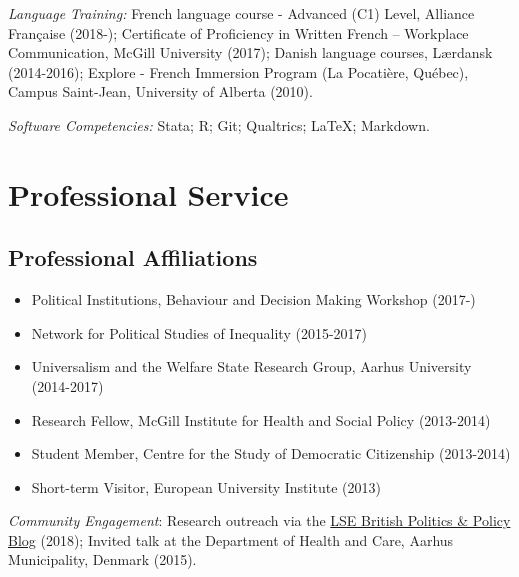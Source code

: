 \documentclass[letterpaper,fontsize=10pt]{scrartcl}
\begin{document}
{} \textit{Language Training:} French language course - Advanced (C1) Level, Alliance Française (2018-); Certificate of Proficiency in Written French – Workplace Communication, McGill University (2017); Danish language courses, Lærdansk (2014-2016); Explore - French Immersion Program (La Pocatière, Québec), Campus Saint-Jean, University of Alberta (2010).\\[-1ex]

{} \textit{Software Competencies:} Stata; R; Git; Qualtrics; \LaTeX ; Markdown.

\section{Professional Service}

	\vspace{-.5em}
	\subsection{Professional Affiliations}
	\vspace{-.5em}
		\begin{itemize}[noitemsep]
		\item Political Institutions, Behaviour and Decision Making Workshop (2017-)
		\item Network for Political Studies of Inequality (2015-2017)
		\item Universalism and the Welfare State Research Group, Aarhus University (2014-2017)
		\item Research Fellow, McGill Institute for Health and Social Policy (2013-2014)
		\item Student Member, Centre for the Study of Democratic Citizenship (2013-2014)
		\item Short-term Visitor, European University Institute (2013)
	\end{itemize}

	 \textit{Community Engagement}: Research outreach via the \href{http://blogs.lse.ac.uk/politicsandpolicy/how-claims-about-welfare-benefit-levels-affect-public-opinion/}{LSE British Politics \& Policy Blog} (2018); Invited talk at the Department of Health and Care, Aarhus Municipality, Denmark (2015).\\ [-1ex]
\end{document}
